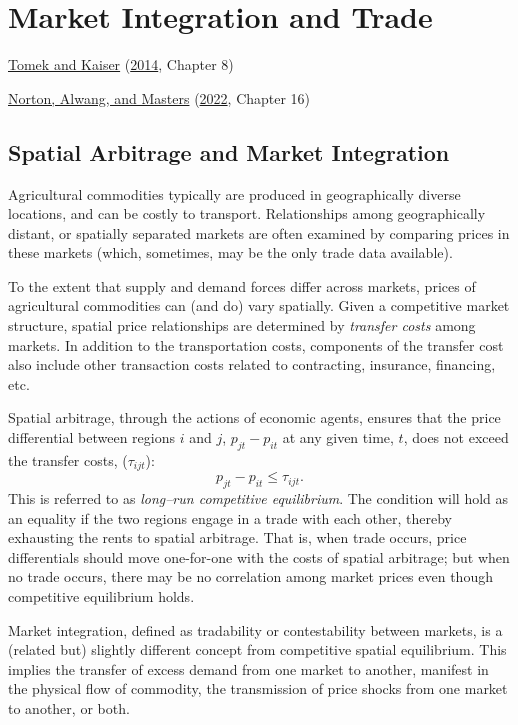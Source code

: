 \documentclass[
  oneside]{book}
\begin{document}
\hypertarget{market-integration-and-trade}{%
\chapter{Market Integration and Trade}\label{market-integration-and-trade}}

\protect\hyperlink{ref-tomek2014}{Tomek and Kaiser} (\protect\hyperlink{ref-tomek2014}{2014}, Chapter 8)

\protect\hyperlink{ref-norton2022}{Norton, Alwang, and Masters} (\protect\hyperlink{ref-norton2022}{2022}, Chapter 16)

\hypertarget{spatial-arbitrage-and-market-integration}{%
\section{Spatial Arbitrage and Market Integration}\label{spatial-arbitrage-and-market-integration}}

Agricultural commodities typically are produced in geographically diverse locations, and can be costly to transport. Relationships among geographically distant, or spatially separated markets are often examined by comparing prices in these markets (which, sometimes, may be the only trade data available).

To the extent that supply and demand forces differ across markets, prices of agricultural commodities can (and do) vary spatially. Given a competitive market structure, spatial price relationships are determined by \emph{transfer costs} among markets. In addition to the transportation costs, components of the transfer cost also include other transaction costs related to contracting, insurance, financing, etc.

Spatial arbitrage, through the actions of economic agents, ensures that the price differential between regions \(i\) and \(j\), \(p_{jt}-p_{it}\) at any given time, \(t\), does not exceed the transfer costs, (\(\tau_{ijt}\)): \[p_{jt}-p_{it} \le \tau_{ijt}.\] This is referred to as \emph{long--run competitive equilibrium}. The condition will hold as an equality if the two regions engage in a trade with each other, thereby exhausting the rents to spatial arbitrage. That is, when trade occurs, price differentials should move one-for-one with the costs of spatial arbitrage; but when no trade occurs, there may be no correlation among market prices even though competitive equilibrium holds.

Market integration, defined as tradability or contestability between markets, is a (related but) slightly different concept from competitive spatial equilibrium. This implies the transfer of excess demand from one market to another, manifest
in the physical flow of commodity, the transmission of price shocks from one market to another, or both.
\end{document}
